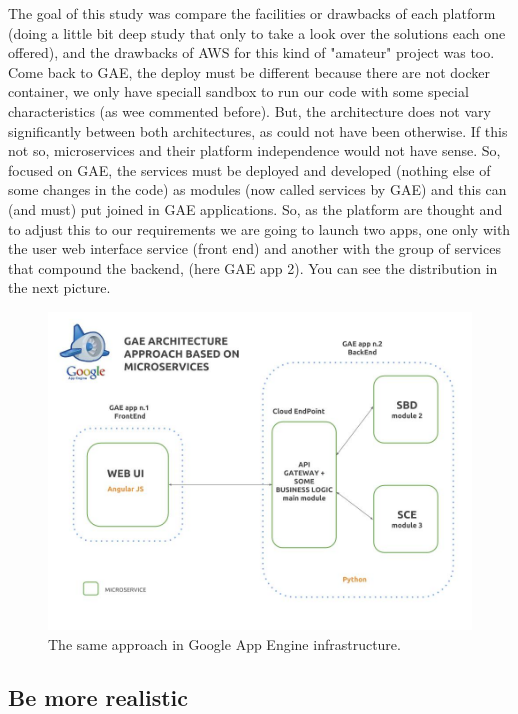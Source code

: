 \noindent The goal of this study was compare the facilities or drawbacks of each platform
(doing a little bit deep study that only to take a look over the solutions each
one offered), and the drawbacks of AWS for this kind of "amateur" project was too.
\intro
Come back to GAE, the deploy must be different because there are not docker
container, we only have speciall sandbox to run our code with some special
characteristics (as wee commented before). But, the architecture does not vary
significantly between both architectures, as could not have been otherwise.
If this not so, microservices and their platform independence would not have sense.
\intro
So, focused on GAE, the services must be deployed and developed (nothing else of
some changes in the code) as modules (now called services by GAE) and this can
(and must) put joined in GAE applications. So, as the platform are thought and
to adjust this to our requirements we are going to launch two apps, one only with
the user web interface service (front end) and another with the group of services
that compound the backend, (here GAE app 2).
You can see the distribution in the next picture.

\begin{figure}[H]
  \includegraphics[scale=0.35]{img/graphics/gae_approach.jpg}
  \centering
  \caption{The same approach in Google App Engine infrastructure.}
\end{figure}


\subsection{Be more realistic}

